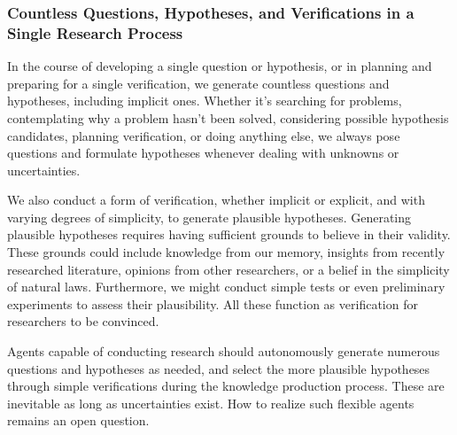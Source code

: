 
\subsubsection{Countless Questions, Hypotheses, and Verifications in a Single Research Process}
In the course of developing a single question or hypothesis, or in planning and preparing for a single verification, we generate countless questions and hypotheses, including implicit ones. Whether it's searching for problems, contemplating why a problem hasn't been solved, considering possible hypothesis candidates, planning verification, or doing anything else, we always pose questions and formulate hypotheses whenever dealing with unknowns or uncertainties. 


We also conduct a form of verification, whether implicit or explicit, and with varying degrees of simplicity, to generate plausible hypotheses. Generating plausible hypotheses requires having sufficient grounds to believe in their validity. These grounds could include knowledge from our memory, insights from recently researched literature, opinions from other researchers, or a belief in the simplicity of natural laws. Furthermore, we might conduct simple tests or even preliminary experiments to assess their plausibility. All these function as verification for researchers to be convinced.

Agents capable of conducting research should autonomously generate numerous questions and hypotheses as needed, and select the more plausible hypotheses through simple verifications during the knowledge production process. These are inevitable as long as uncertainties exist. How to realize such flexible agents remains an open question.







